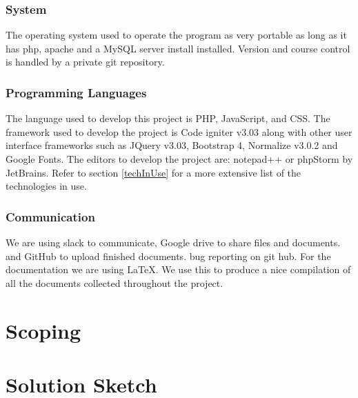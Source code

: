 \documentclass[12pt]{article}
\begin{document}
\subsubsection{System}

The operating system used to operate the program as very portable as long as it has php, apache and a MySQL server install installed.  Version and course control is handled by a private git repository. 

\subsubsection{Programming Languages}
The language used to develop this project is PHP, JavaScript, and CSS. The framework used to develop the project is Code igniter v3.03 along with other user interface frameworks such as JQuery v3.03, Bootstrap  4, Normalize v3.0.2  and Google Fonts. The editors to develop the project are: notepad++ or phpStorm by JetBrains. Refer to section \ref{techInUse} for a more extensive list of the technologies in use.

\subsubsection{Communication}

We are using slack to communicate, Google drive to share files and documents. and GitHub to upload finished documents. bug reporting on git hub. For the documentation we are using LaTeX. We use this to produce a nice compilation of all the documents collected throughout the project.  

\section{Scoping}


\section{Solution Sketch}
\end{document}
